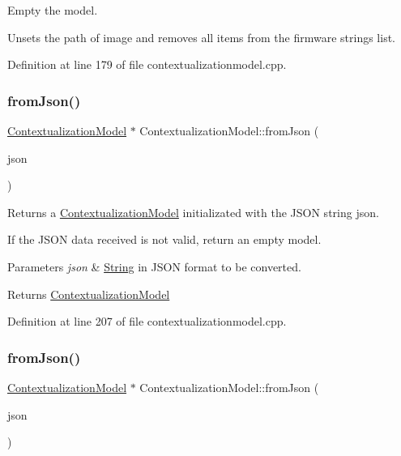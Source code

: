 Empty the model. 

Unsets the path of image and removes all items from the firmware strings list. 

Definition at line 179 of file contextualizationmodel.\+cpp.

\mbox{\label{classContextualizationModel_aa334a054aa36564d56e812a1a9e6de30}} 
\subsubsection{\texorpdfstring{from\+Json()}{fromJson()}\hspace{0.1cm}{\footnotesize\ttfamily [1/2]}}
{\footnotesize\ttfamily \mbox{\hyperlink{classContextualizationModel}{Contextualization\+Model}} $\ast$ Contextualization\+Model\+::from\+Json (\begin{DoxyParamCaption}\item[{Q\+String \&}]{json }\end{DoxyParamCaption})\hspace{0.3cm}{\ttfamily [static]}}



Returns a \mbox{\hyperlink{classContextualizationModel}{Contextualization\+Model}} initializated with the J\+S\+ON string json. 

If the J\+S\+ON data received is not valid, return an empty model. 
\begin{DoxyParams}{Parameters}
{\em json} & \mbox{\hyperlink{classString}{String}} in J\+S\+ON format to be converted. \\
\hline
\end{DoxyParams}
\begin{DoxyReturn}{Returns}
\mbox{\hyperlink{classContextualizationModel}{Contextualization\+Model}} 
\end{DoxyReturn}


Definition at line 207 of file contextualizationmodel.\+cpp.

\mbox{\label{classContextualizationModel_a08ac67d6c9c3b949e9085d131fa47619}} 
\subsubsection{\texorpdfstring{from\+Json()}{fromJson()}\hspace{0.1cm}{\footnotesize\ttfamily [2/2]}}
{\footnotesize\ttfamily \mbox{\hyperlink{classContextualizationModel}{Contextualization\+Model}} $\ast$ Contextualization\+Model\+::from\+Json (\begin{DoxyParamCaption}\item[{Q\+Byte\+Array \&}]{json }\end{DoxyParamCaption})\hspace{0.3cm}{\ttfamily [static]}}



